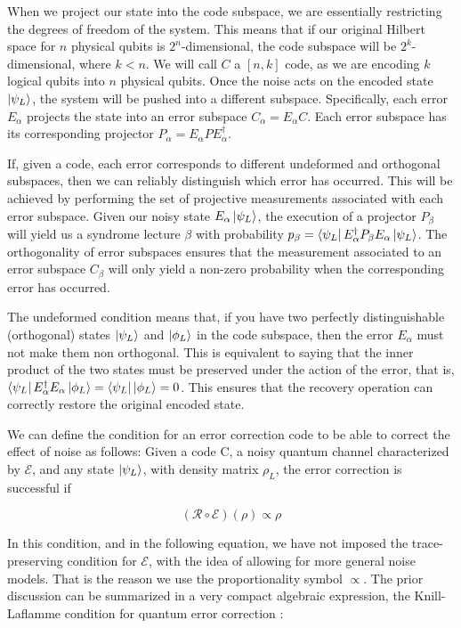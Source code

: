 \documentclass[12pt, twoside, openany]{book}
\begin{document}
When we project our state into the code subspace, we are essentially restricting the degrees of freedom of the system. This means that if our original Hilbert space for $n$ physical qubits is $2^n$-dimensional, the code subspace will be $2^k$-dimensional, where $k < n$. We will call $C$ a $[n,k]$ code, as we are encoding $k$ logical qubits into $n$ physical qubits. Once the noise acts on the encoded state $\ket{\psi_L}$, the system will be pushed into a different subspace. Specifically, each error $E_\alpha$ projects the state into an error subspace $C_\alpha = E_\alpha C$. Each error subspace has its corresponding projector $P_\alpha = E_\alpha P E_\alpha^\dagger$. 

If, given a code, each error corresponds to different undeformed and orthogonal subspaces, then we can reliably distinguish which error has occurred. This will be achieved by performing the set of projective measurements associated with each error subspace. Given our noisy state $E_\alpha \ket{\psi_L}$, the execution of a projector $P_\beta$ will yield us a syndrome lecture $\beta$ with probability $p_\beta = \bra{\psi_L} E_\alpha^\dagger P_\beta E_\alpha \ket{\psi_L}$. The orthogonality of error subspaces ensures that the measurement associated to an error subspace $C_\beta$ will only yield a non-zero probability when the corresponding error has occurred. 

The undeformed condition means that, if you have two perfectly distinguishable (orthogonal) states $\ket{\psi_L}$ and $\ket{\phi_L}$ in the code subspace, then the error $E_\alpha$ must not make them non orthogonal. This is equivalent to saying that the inner product of the two states must be preserved under the action of the error, that is, $\bra{\psi_L} E_\alpha^\dagger E_\alpha \ket{\phi_L} = \bra{\psi_L} \ket{\phi_L} = 0$. This ensures that the recovery operation can correctly restore the original encoded state. 

We can define the condition for an error correction code to be able to correct the effect of noise as follows: Given a code C, a noisy quantum channel characterized by $\mathcal{E}$, and any state $\ket{\psi_L}$, with density matrix $\rho_L$, the error correction is successful if 

\begin{equation} \label{QECgeneral}
    ( \mathcal{R} \circ \mathcal{E} ) (\rho) \propto \rho
\end{equation}

In this condition, and in the following equation, we have not imposed the trace-preserving condition for $\mathcal{E}$, with the idea of allowing for more general noise models. That is the reason we use the proportionality symbol $\propto$. The prior discussion can be summarized in a very compact algebraic expression, the Knill-Laflamme condition for quantum error correction \cite{Knill_2000}:
\end{document}
